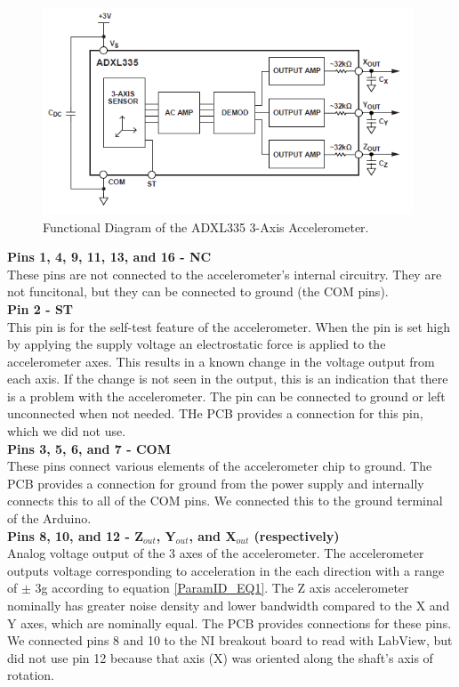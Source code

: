 \documentclass{article}
\theoremstyle{plain}
\theoremstyle{definition}
\theoremstyle{remark}
\begin{document}
\begin{figure}[hbt]
\begin{center}
\includegraphics[width = 11cm]{ADXL335Functional.png}
\caption{Functional Diagram of the ADXL335 3-Axis Accelerometer.}
\label{accelFunc}
\end{center}
\end{figure}

\textbf{Pins 1, 4, 9, 11, 13, and 16 - NC}\\
These pins are not connected to the accelerometer's internal circuitry. They are not funcitonal, but they can be connected to ground (the COM pins).\\

\textbf{ Pin 2 - ST}\\
This pin is for the self-test feature of the accelerometer. When the pin is set high by applying the supply voltage an electrostatic force is applied to the accelerometer axes. This results in a known change in the voltage output from each axis. If the change is not seen in the output, this is an indication that there is a problem with the accelerometer. The pin can be connected to ground or left unconnected when not needed. THe PCB provides a connection for this pin, which we did not use.\\

\textbf{Pins 3, 5, 6, and 7 - COM}\\
These pins connect various elements of the accelerometer chip to ground. The PCB provides a connection for ground from the power supply and internally connects this to all of the COM pins. We connected this to the ground terminal of the Arduino.\\

\textbf{Pins 8, 10, and 12 - Z$_{out}$, Y$_{out}$, and X$_{out}$ (respectively)}\\ 
Analog voltage output of the 3 axes of the accelerometer. The accelerometer outputs voltage corresponding to acceleration in the each direction with a range of $\pm$ 3g according to equation \ref{ParamID_EQ1}. The Z axis accelerometer nominally has greater noise density and lower bandwidth compared to the X and Y axes, which are nominally equal. The PCB provides connections for these pins. We connected pins 8 and 10 to the NI breakout board to read with LabView, but did not use pin 12 because that axis (X) was oriented along the shaft's axis of rotation.\\
\end{document}
